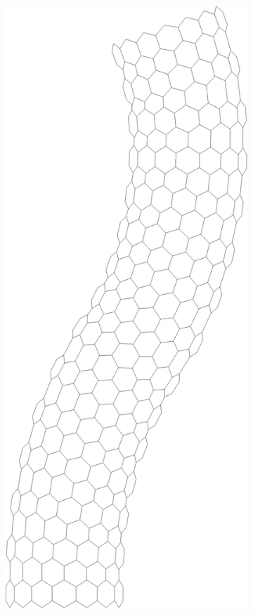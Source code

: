 \begin{figure}[t!]
\begin{subfigure}[t]{.33\textwidth}
			\includegraphics[scale=.25]{./old_fig/Nanotube.eps}
			\caption{\label{subfig:Nanotube}}
		\end{subfigure}%
		~
		\begin{subfigure}[t]{.33\textwidth}

\end{subfigure}
\end{figure}
